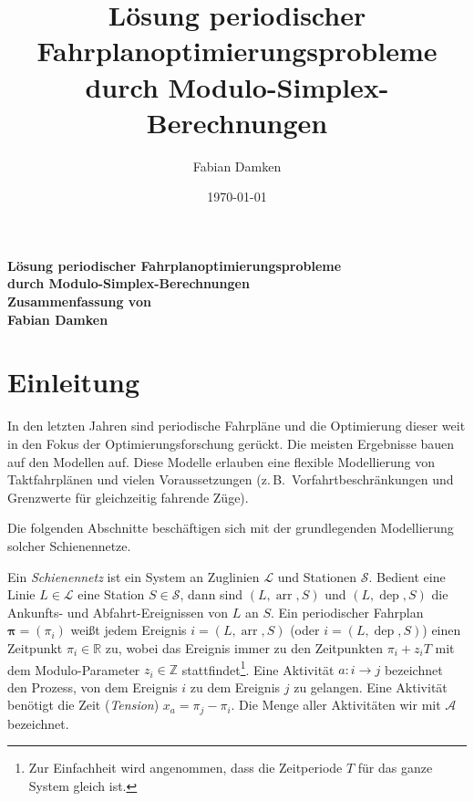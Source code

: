 \documentclass[a4paper, 11pt, twocolumn]{scrartcl}
\title{Lösung periodischer Fahrplanoptimierungsprobleme durch Modulo-Simplex-Berechnungen}
\author{Fabian Damken}
\date{\today}
\newcommand{\R}{\ensuremath{\mathbb{R}}}
\newcommand{\Z}{\ensuremath{\mathbb{Z}}}
\renewcommand{\vec}[1]{\boldsymbol{\mathbf{#1}}}
\DeclareMathOperator{\arr}{arr}
\DeclareMathOperator{\dep}{dep}
\newcommand{\zB}{z.\,B.~}
\begin{document}
	

	\makeatletter
	\begin{center}
		\textbf{\Large Lösung periodischer \mbox{Fahrplanoptimierungsprobleme} \\ \vspace{2mm} durch Modulo-Simplex-Berechnungen} \\ \vspace{2mm}
		\textbf{\large Zusammenfassung von \cite{nachtigallSolvingPeriodicTimetable2008}} \\ \vspace{3mm}
		\textbf{\large Fabian Damken} \\ \vspace{1mm}
		{\large \@date}
	\end{center}
	\makeatother

	\section{Einleitung}
		In den letzten Jahren sind periodische Fahrpläne und die Optimierung dieser weit in den Fokus der Optimierungsforschung gerückt. Die meisten Ergebnisse bauen auf den Modellen \cite{serafiniMathematicalModelPeriodic1989} auf. Diese Modelle erlauben eine flexible Modellierung von Taktfahrplänen und vielen Voraussetzungen (\zB Vorfahrtbeschränkungen und Grenzwerte für gleichzeitig fahrende Züge).
		
		Die folgenden Abschnitte beschäftigen sich mit der grundlegenden Modellierung solcher Schienennetze.
		
		Ein \emph{Schienennetz} ist ein System an Zuglinien \(\mathcal{L}\) und Stationen \(\mathcal{S}\). Bedient eine Linie \(L \in \mathcal{L}\) eine Station \(S \in \mathcal{S}\), dann sind \( (L, \arr, S) \) und \( (L, \dep, S) \) die Ankunfts- und Abfahrt-Ereignissen von \(L\) an \(S\). Ein periodischer Fahrplan \( \vec{\pi} = (\pi_i) \) weißt jedem Ereignis \( i = (L, \arr, S) \) (oder \( i = (L, \dep, S) \)) einen Zeitpunkt \( \pi_i \in \R \) zu, wobei das Ereignis immer zu den Zeitpunkten \( \pi_i + z_i T \) mit dem Modulo-Parameter \( z_i \in \Z \) stattfindet\footnote{Zur Einfachheit wird angenommen, dass die Zeitperiode \(T\) für das ganze System gleich ist.}. Eine Aktivität \( a : i \to j \) bezeichnet den Prozess, von dem Ereignis \(i\) zu dem Ereignis \(j\) zu gelangen. Eine Aktivität benötigt die Zeit (\emph{Tension}) \( x_a = \pi_j - \pi_i \). Die Menge aller Aktivitäten wir mit \( \mathcal{A} \) bezeichnet.
		
\end{document}
